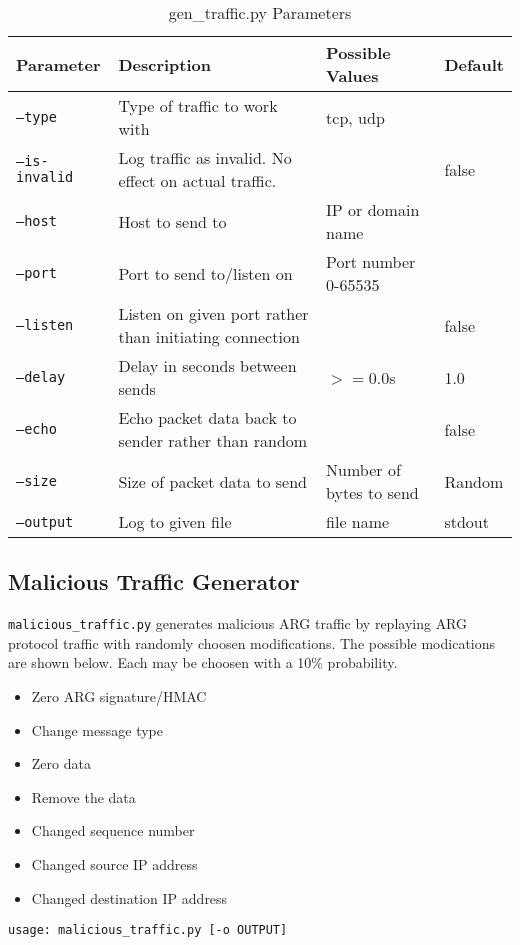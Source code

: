 \begin{table}
\caption{gen\_traffic.py Parameters}
\label{tbl:gen_traffic_param}
\centering
\begin{tabular}{l|p{2in}|l|l}
Parameter & Description & Possible Values & Default\\
\hline
\texttt{--type} & Type of traffic to work with & tcp, udp & \\
\texttt{--is-invalid} & Log traffic as invalid. No effect on actual traffic. & & false\\
\texttt{--host} & Host to send to & \ac{IP} or domain name & \\
\texttt{--port} & Port to send to/listen on & Port number 0-65535 & \\
\texttt{--listen} & Listen on given port rather than initiating connection & & false\\
\texttt{--delay} & Delay in seconds between sends & $>=$0.0s & 1.0\\
\texttt{--echo} & Echo packet data back to sender rather than random & & false\\
\texttt{--size} & Size of packet data to send & Number of bytes to send & Random\\
\texttt{--output} & Log to given file & file name & stdout
\end{tabular}
\end{table}

\subsection{Malicious Traffic Generator}
\par \texttt{malicious\_traffic.py} generates malicious ARG traffic by replaying \ac{ARG} protocol traffic with randomly choosen modifications. The possible modications are shown below. Each may be choosen with a 10\% probability.
{\singlespace
\begin{itemize}
\item Zero \ac{ARG} signature/\ac{HMAC}
\item Change message type
\item Zero data
\item Remove the data
\item Changed sequence number
\item Changed source \ac{IP} address
\item Changed destination \ac{IP} address
\end{itemize}
}

\begin{lstlisting}
usage: malicious_traffic.py [-o OUTPUT]
\end{lstlisting}

